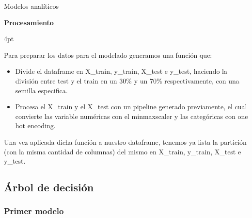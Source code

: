 \documentclass[pdf]{beamer}
\def\vspace{}%
\begin{document}
\begin{frame}{Modelos analíticos}

    \begin{Large}
        \textbf{Procesamiento}
    \end{Large}
    \vspace{4pt}

    Para preparar los datos para el modelado generamos una función que:
    \begin{itemize}
        \justifying
        \item  Divide el dataframe en X\_train, y\_train, X\_test e y\_test, haciendo la división entre test y el train en un 30\% y un 70\% respectivamente, con una semilla especifica.
        \item  Procesa el X\_train y el X\_test con un pipeline generado previamente, el cual convierte las variable numéricas con el minmaxscaler y las categóricas con one hot encoding.
    \end{itemize}

    Una vez aplicada dicha función a nuestro dataframe, tenemos ya lista la partición (con la misma cantidad de columnas) del mismo en X\_train, y\_train, X\_test e y\_test.

\end{frame}

    \subsection{Árbol de decisión}

        \subsubsection{Primer modelo}
\end{document}
